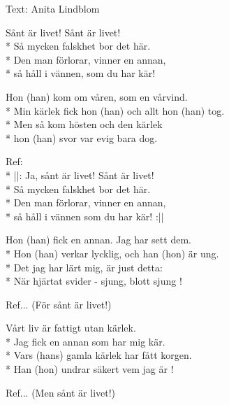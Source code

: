 \begin{SongText}
\begin{SongInfo}
    Text: Anita Lindblom
\end{SongInfo}
\begin{SongVerse}
Sånt är livet! Sånt är livet!\\*%
Så mycken falskhet bor det här.\\*%
Den man förlorar, vinner en annan,\\*%
så håll i vännen, som du har kär!
\end{SongVerse}
\begin{SongVerse}
Hon (han) kom om våren, som en vårvind.\\*%
Min kärlek fick hon (han) och allt hon (han) tog.\\*%
Men så kom hösten och den kärlek\\*%
hon (han) svor var evig bara dog.
\end{SongVerse}
\begin{SongVerse}
Ref:\\*%
||: Ja, sånt är livet! Sånt är livet!\\*%
Så mycken falskhet bor det här.\\*%
Den man förlorar, vinner en annan,\\*%
så håll i vännen som du har kär! :||
\end{SongVerse}
\begin{SongVerse}
Hon (han) fick en annan. Jag har sett dem.\\*%
Hon (han) verkar lycklig, och han (hon) är ung.\\*%
Det jag har lärt mig, är just detta:\\*%
När hjärtat svider - sjung, blott sjung !
\end{SongVerse}
\begin{SongVerse}
Ref... (För sånt är livet!)
\end{SongVerse}
\begin{SongVerse}
Vårt liv är fattigt utan kärlek.\\*%
Jag fick en annan som har mig kär.\\*%
Vars (hans) gamla kärlek har fått korgen.\\*%
Han (hon) undrar säkert vem jag är !
\end{SongVerse}
\begin{SongVerse}
Ref... (Men sånt är livet!)
\end{SongVerse}
\end{SongText}

